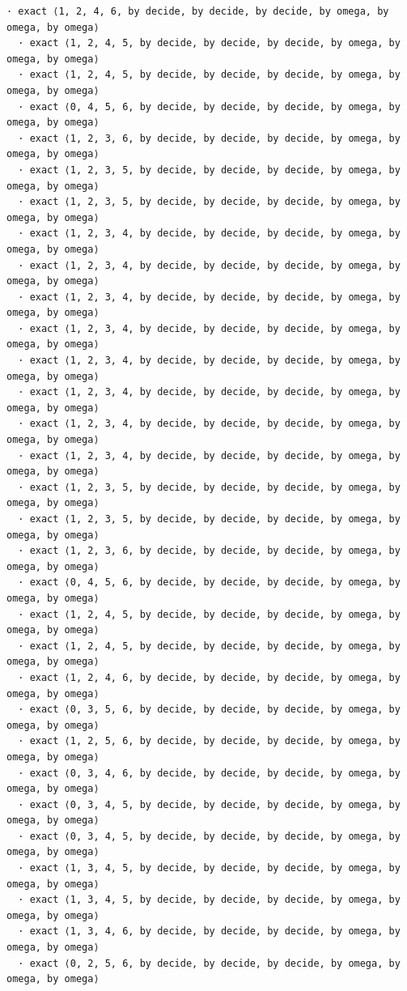 \documentclass[11pt,a4paper]{article}
\begin{document}
\begin{Verbatim}[breaklines,breakanywhere,fontsize=\footnotesize]
  · exact ⟨1, 2, 4, 6, by decide, by decide, by decide, by omega, by omega, by omega⟩
  · exact ⟨1, 2, 4, 5, by decide, by decide, by decide, by omega, by omega, by omega⟩
  · exact ⟨1, 2, 4, 5, by decide, by decide, by decide, by omega, by omega, by omega⟩
  · exact ⟨0, 4, 5, 6, by decide, by decide, by decide, by omega, by omega, by omega⟩
  · exact ⟨1, 2, 3, 6, by decide, by decide, by decide, by omega, by omega, by omega⟩
  · exact ⟨1, 2, 3, 5, by decide, by decide, by decide, by omega, by omega, by omega⟩
  · exact ⟨1, 2, 3, 5, by decide, by decide, by decide, by omega, by omega, by omega⟩
  · exact ⟨1, 2, 3, 4, by decide, by decide, by decide, by omega, by omega, by omega⟩
  · exact ⟨1, 2, 3, 4, by decide, by decide, by decide, by omega, by omega, by omega⟩
  · exact ⟨1, 2, 3, 4, by decide, by decide, by decide, by omega, by omega, by omega⟩
  · exact ⟨1, 2, 3, 4, by decide, by decide, by decide, by omega, by omega, by omega⟩
  · exact ⟨1, 2, 3, 4, by decide, by decide, by decide, by omega, by omega, by omega⟩
  · exact ⟨1, 2, 3, 4, by decide, by decide, by decide, by omega, by omega, by omega⟩
  · exact ⟨1, 2, 3, 4, by decide, by decide, by decide, by omega, by omega, by omega⟩
  · exact ⟨1, 2, 3, 4, by decide, by decide, by decide, by omega, by omega, by omega⟩
  · exact ⟨1, 2, 3, 5, by decide, by decide, by decide, by omega, by omega, by omega⟩
  · exact ⟨1, 2, 3, 5, by decide, by decide, by decide, by omega, by omega, by omega⟩
  · exact ⟨1, 2, 3, 6, by decide, by decide, by decide, by omega, by omega, by omega⟩
  · exact ⟨0, 4, 5, 6, by decide, by decide, by decide, by omega, by omega, by omega⟩
  · exact ⟨1, 2, 4, 5, by decide, by decide, by decide, by omega, by omega, by omega⟩
  · exact ⟨1, 2, 4, 5, by decide, by decide, by decide, by omega, by omega, by omega⟩
  · exact ⟨1, 2, 4, 6, by decide, by decide, by decide, by omega, by omega, by omega⟩
  · exact ⟨0, 3, 5, 6, by decide, by decide, by decide, by omega, by omega, by omega⟩
  · exact ⟨1, 2, 5, 6, by decide, by decide, by decide, by omega, by omega, by omega⟩
  · exact ⟨0, 3, 4, 6, by decide, by decide, by decide, by omega, by omega, by omega⟩
  · exact ⟨0, 3, 4, 5, by decide, by decide, by decide, by omega, by omega, by omega⟩
  · exact ⟨0, 3, 4, 5, by decide, by decide, by decide, by omega, by omega, by omega⟩
  · exact ⟨1, 3, 4, 5, by decide, by decide, by decide, by omega, by omega, by omega⟩
  · exact ⟨1, 3, 4, 5, by decide, by decide, by decide, by omega, by omega, by omega⟩
  · exact ⟨1, 3, 4, 6, by decide, by decide, by decide, by omega, by omega, by omega⟩
  · exact ⟨0, 2, 5, 6, by decide, by decide, by decide, by omega, by omega, by omega⟩

\end{Verbatim}
\end{document}
